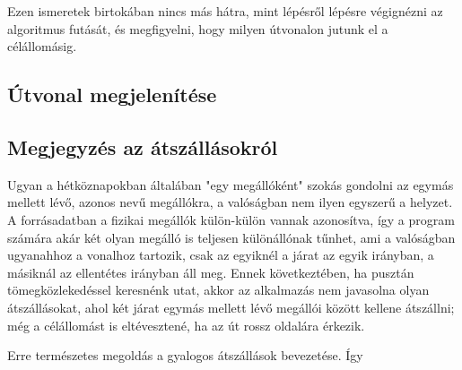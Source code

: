 Ezen ismeretek birtokában nincs más hátra, mint lépésről lépésre végignézni az algoritmus futását, és megfigyelni, hogy milyen útvonalon jutunk el a célállomásig.

\subsection{Útvonal megjelenítése}

\subsection{Megjegyzés az átszállásokról}

Ugyan a hétköznapokban általában "egy megállóként" szokás gondolni az egymás mellett lévő, azonos nevű megállókra, a valóságban nem ilyen egyszerű a helyzet. A forrásadatban a fizikai megállók külön-külön vannak azonosítva, így a program számára akár két olyan megálló is teljesen különállónak tűnhet, ami a valóságban ugyanahhoz a vonalhoz tartozik, csak az egyiknél a járat az egyik irányban, a másiknál az ellentétes irányban áll meg. Ennek következtében, ha pusztán tömegközlekedéssel keresnénk utat, akkor az alkalmazás nem javasolna olyan átszállásokat, ahol két járat egymás mellett lévő megállói között kellene átszállni; még a célállomást is eltévesztené, ha az út rossz oldalára érkezik.

Erre természetes megoldás a gyalogos átszállások bevezetése. Így 

